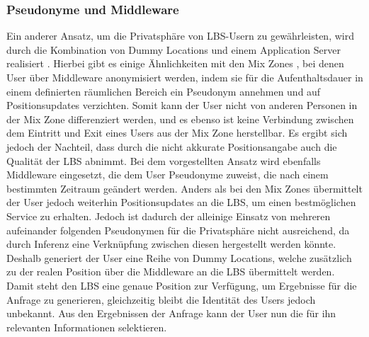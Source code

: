 \subsubsection{Pseudonyme und Middleware} \label{subsubsection:pseudomiddle}
Ein anderer Ansatz, um die Privatsphäre von LBS-Usern zu gewährleisten, wird durch die Kombination von Dummy Locations und einem Application Server realisiert \cite{Sahu2012}. Hierbei gibt es einige Ähnlichkeiten mit den Mix Zones \cite{Beresford2003}, bei denen User über Middleware anonymisiert werden, indem sie für die Aufenthaltsdauer in einem definierten räumlichen Bereich ein Pseudonym annehmen und auf Positionsupdates verzichten. Somit kann der User nicht von anderen Personen in der Mix Zone differenziert werden, und es ebenso ist keine Verbindung zwischen dem Eintritt und Exit eines Users aus der Mix Zone herstellbar. Es ergibt sich jedoch der Nachteil, dass durch die nicht akkurate Positionsangabe auch die Qualität der LBS abnimmt. 
Bei dem vorgestellten Ansatz wird ebenfalls Middleware eingesetzt, die dem User Pseudonyme zuweist, die nach einem bestimmten Zeitraum geändert werden. Anders als bei den Mix Zones übermittelt der User jedoch weiterhin Positionsupdates an die LBS, um einen bestmöglichen Service zu erhalten. Jedoch ist dadurch der alleinige Einsatz von mehreren aufeinander folgenden Pseudonymen für die Privatsphäre nicht ausreichend, da durch Inferenz eine Verknüpfung zwischen diesen hergestellt werden könnte. Deshalb generiert der User eine Reihe von Dummy Locations, welche zusätzlich zu der realen Position über die Middleware an die LBS übermittelt werden. Damit steht den LBS eine genaue Position zur Verfügung, um Ergebnisse für die Anfrage zu generieren, gleichzeitig bleibt die Identität des Users jedoch unbekannt. Aus den Ergebnissen der Anfrage kann der User nun die für ihn relevanten Informationen selektieren.
